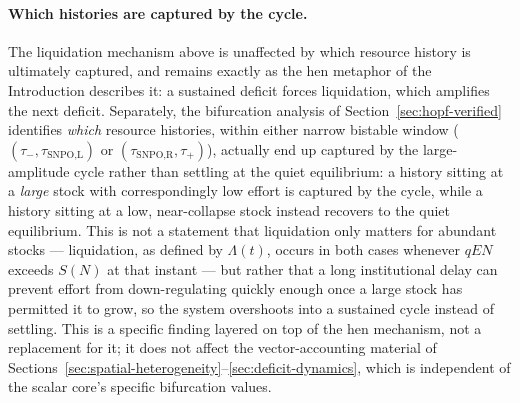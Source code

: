 \documentclass[twocolumn,10pt]{article}
\begin{document}
\paragraph{Which histories are captured by the cycle.} The liquidation mechanism above is unaffected by which resource history is ultimately captured, and remains exactly as the hen metaphor of the Introduction describes it: a sustained deficit forces liquidation, which amplifies the next deficit. Separately, the bifurcation analysis of Section~\ref{sec:hopf-verified} identifies \emph{which} resource histories, within either narrow bistable window ($(\tau_-,\tau_{\text{SNPO,L}})$ or $(\tau_{\text{SNPO,R}},\tau_+)$), actually end up captured by the large-amplitude cycle rather than settling at the quiet equilibrium: a history sitting at a \emph{large} stock with correspondingly low effort is captured by the cycle, while a history sitting at a low, near-collapse stock instead recovers to the quiet equilibrium. This is not a statement that liquidation only matters for abundant stocks — liquidation, as defined by $\Lambda(t)$, occurs in both cases whenever $qEN$ exceeds $S(N)$ at that instant — but rather that a long institutional delay can prevent effort from down-regulating quickly enough once a large stock has permitted it to grow, so the system overshoots into a sustained cycle instead of settling. This is a specific finding layered on top of the hen mechanism, not a replacement for it; it does not affect the vector-accounting material of Sections~\ref{sec:spatial-heterogeneity}--\ref{sec:deficit-dynamics}, which is independent of the scalar core's specific bifurcation values.
\end{document}
